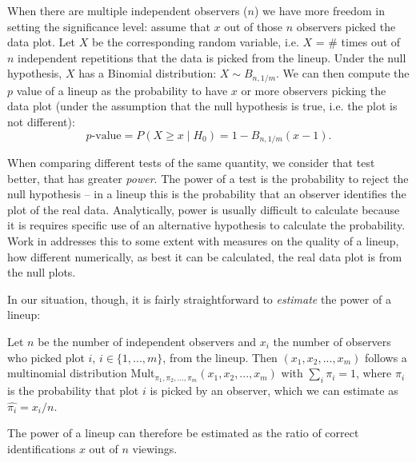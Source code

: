 When there are multiple independent observers ($n$) we have more freedom in setting  the significance level: assume that $x$ out of those $n$ observers picked the data plot. Let $X$ be the corresponding random variable, i.e. $X$ = \# times out of $n$ independent repetitions that  the data is picked from the lineup. Under the null hypothesis, $X$ has a Binomial distribution: $X \sim B_{n, 1/m}$.
We can then compute the $p$ value of a lineup as the probability to have $x$ or more observers picking the data plot (under the assumption that the null hypothesis is true, i.e. the plot is not different):
\[
p\text{-value} = P(X \ge x \mid H_0) =   1 - B_{n, 1/m} (x-1).
\]

When comparing different tests of the same quantity, we consider that test better, that has greater {\it power}.
The power of a test is the probability to reject the null hypothesis -- in a lineup this is the probability that an observer identifies the plot of the real data. 
Analytically, power is usually difficult to calculate because it is requires specific use of an alternative hypothesis to calculate the probability.  Work in \citet{niladri:2012} addresses this to some extent with measures on the quality of a lineup, how different numerically, as best it can be calculated, the real data plot is from the null plots. 

In our situation, though, it is fairly straightforward to {\it estimate} the power of a lineup:

Let $n$ be the number of independent observers and $x_i$ the number of observers who picked plot $i$, $i \in \{1, ..., m\}$, from the lineup. Then $(x_1, x_2, ..., x_m)$ follows a multinomial distribution Mult$_{\pi_1, \pi_2, ..., \pi_m}(x_1, x_2, ..., x_m)$ with $\sum_i \pi_i = 1$, where $\pi_i$ is the probability that plot $i$ is picked by an observer, which we can estimate as $\widehat{\pi_i} = x_i/n$. 

The power of a lineup can therefore be estimated as the ratio of correct identifications $x$ out of $n$ viewings.

